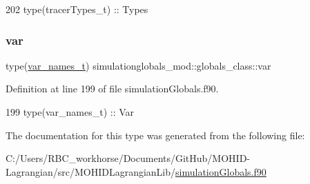 \begin{DoxyCode}
202         \textcolor{keywordtype}{type}(tracerTypes\_t) :: Types
\end{DoxyCode}
\mbox{\label{structsimulationglobals__mod_1_1globals__class_a752c7c8dc10d072eda09d345a69dca1e}} 
\subsubsection{\texorpdfstring{var}{var}}
{\footnotesize\ttfamily type(\mbox{\hyperlink{structsimulationglobals__mod_1_1var__names__t}{var\+\_\+names\+\_\+t}}) simulationglobals\+\_\+mod\+::globals\+\_\+class\+::var\hspace{0.3cm}{\ttfamily [private]}}



Definition at line 199 of file simulation\+Globals.\+f90.


\begin{DoxyCode}
199         \textcolor{keywordtype}{type}(var\_names\_t)   :: Var
\end{DoxyCode}


The documentation for this type was generated from the following file\+:\begin{DoxyCompactItemize}
\item 
C\+:/\+Users/\+R\+B\+C\+\_\+workhorse/\+Documents/\+Git\+Hub/\+M\+O\+H\+I\+D-\/\+Lagrangian/src/\+M\+O\+H\+I\+D\+Lagrangian\+Lib/\mbox{\hyperlink{simulation_globals_8f90}{simulation\+Globals.\+f90}}\end{DoxyCompactItemize}
